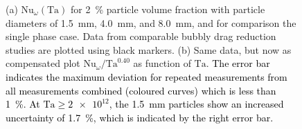 \documentclass{jfm}
\newcommand\Nus{\text{Nu}}
\newcommand\Tay{\text{Ta}}
\newcommand{\red}[1]{\textcolor{black}{#1}}
\begin{document}
\begin{figure}
\centering%
%
%
\caption{%
(a) $\Nus_\omega (\Tay)$ for \SI{2}{\percent} particle volume fraction with
particle diameters of \SI{1.5}{\milli\metre}, \SI{4.0}{\milli\metre}, and
\SI{8.0}{\milli\metre}, and for comparison the single phase case. Data from
comparable bubbly drag reduction studies are plotted using black markers. (b)
Same data, but now as compensated plot $\Nus_\omega / \Tay^{0.40}$ as function
of $\Tay$.  \red{ The error bar indicates the maximum deviation for repeated
measurements from all measurements combined (coloured curves) which is less
than \SI{1}{\percent}. At $\Tay \geq \num{2e12}$, the \SI{1.5}{\milli\metre}
particles show an increased uncertainty of \SI{1.7}{\percent}, which is
indicated by the right error bar.} }
\label{fig:dragReductionSize}
\end{figure}
\end{document}
